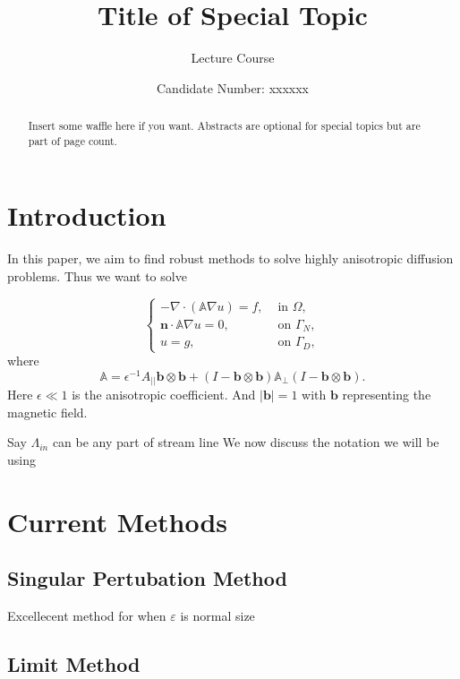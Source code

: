 \documentclass[12pt,a4paper]{article}
\title{Title of Special Topic}
\author{Lecture Course}
\date{Candidate Number: xxxxxx}
\begin{document}
\maketitle

\thispagestyle{empty}

\newpage
\setcounter{page}{1}



\begin{abstract}
  Insert some waffle here if you want. Abstracts are optional for
  special topics but are part of page count.
\end{abstract}

\section{Introduction}
In this paper, we aim to find robust methods to solve highly anisotropic diffusion problems. Thus we want to solve

\begin{equation}
\begin{cases}
-\nabla \cdot (\mathbb{A}\nabla u) = f, & \text{ in }\Omega,\\
\mathbf{n}\cdot \mathbb{A}\nabla u = 0, & \text{ on }\Gamma_N, \\
u = g, & \text{  on }\Gamma_D,
\end{cases}
\end{equation}
where
\begin{equation}
\mathbb{A} = \epsilon^{-1} A_{||}\mathbf{b}\otimes \mathbf{b}
+(I - \mathbf{b}\otimes \mathbf{b})\mathbb{A}_{\perp}
(I - \mathbf{b}\otimes \mathbf{b}).
\end{equation}
    Here $\epsilon \ll 1$ is the anisotropic coefficient. And $|\mathbf{b}|=1$ with $\mathbf{b}$ representing the magnetic field.

Say $\Lambda_{in}$ can be any part of stream line
We now discuss the notation we will be using

\section{Current Methods}
\subsection{Singular Pertubation Method}
Excellecent method for when $\varepsilon$ is normal size

\subsection{Limit Method}
\end{document}
